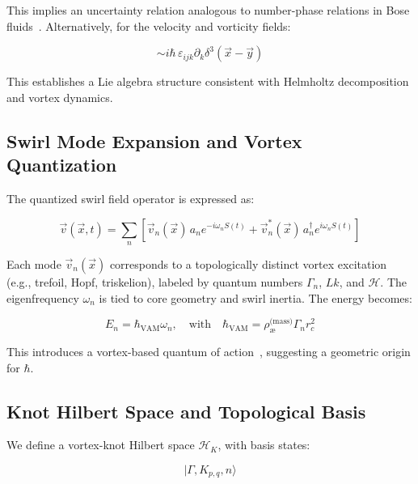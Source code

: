 \documentclass[12pt]{article}
\begin{document}
    This implies an uncertainty relation analogous to number-phase relations in Bose fluids~\cite{volovik2003universe}. Alternatively, for the velocity and vorticity fields:

    \begin{equation}
    [v_i(\vec{x}), \omega_j(\vec{y})] \sim i\hbar\,\varepsilon_{ijk} \partial_k \delta^3(\vec{x} - \vec{y})
    \end{equation}

    This establishes a Lie algebra structure consistent with Helmholtz decomposition and vortex dynamics.

    \subsection{Swirl Mode Expansion and Vortex Quantization}

    The quantized swirl field operator is expressed as:

    \begin{equation}
    \vec{v}(\vec{x}, t) = \sum_n \left[ \vec{v}_n(\vec{x})\, a_n e^{-i\omega_n S(t)} + \vec{v}_n^*(\vec{x})\, a_n^\dagger e^{i\omega_n S(t)} \right]
    \end{equation}

    Each mode \( \vec{v}_n(\vec{x}) \) corresponds to a topologically distinct vortex excitation (e.g., trefoil, Hopf, triskelion), labeled by quantum numbers \( \Gamma_n \), \( Lk \), and \( \mathcal{H} \). The eigenfrequency \( \omega_n \) is tied to core geometry and swirl inertia. The energy becomes:

    \begin{equation}
    E_n = \hbar_{\text{VAM}} \omega_n, \quad \text{with} \quad \hbar_{\text{VAM}} = \rho_{\text{\ae}}^{\text{(mass)}} \Gamma_n r_c^2
    \end{equation}

    This introduces a vortex-based quantum of action~\cite{ranada1992knots}, suggesting a geometric origin for \( \hbar \).

    \subsection{Knot Hilbert Space and Topological Basis}

    We define a vortex-knot Hilbert space \( \mathcal{H}_K \), with basis states:

    \begin{equation}
    | \Gamma, K_{p,q}, n \rangle
    \end{equation}
\end{document}
